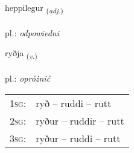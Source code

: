 \documentclass[frontgrid, backgrid]{flacards}\usepackage[]{graphicx}\usepackage[]{xcolor}
\begin{document}
\renewcommand{\flhead}{\vskip5pt \fboxsep=0pt {\small\bfseries\footnotesize Lýsingarorð | przymiotnik}}
\renewcommand{\fcfoot}{\vskip5pt \fboxsep=0pt \hspace{2pt}{\small\bfseries\footnotesize 3K}}

\renewcommand{\blhead}{\vskip5pt {\small\bfseries\footnotesize Lýsingarorð | przymiotnik }}
\renewcommand{\bcfoot}{\vskip5pt \hspace{2pt}{\small\bfseries\footnotesize 3K}}


{heppilegur \small{\textsubscript{(\textit{adj.})}} \\[1ex] %
\textphonetic{[hɛhpɪlɛɣʏr]} \\
pl.: \emph{odpowiedni} \\  [2ex]
\renewcommand*{\arraystretch}{0.8}
}

\renewcommand{\flhead}{\vskip5pt \fboxsep=0pt {\small\bfseries\footnotesize Sagnorð | czasownik}}
\renewcommand{\fcfoot}{\vskip5pt \fboxsep=0pt \hspace{2pt}{\small\bfseries\footnotesize 3K}}

\renewcommand{\blhead}{\vskip5pt {\small\bfseries\footnotesize Sagnorð | czasownik }}
\renewcommand{\bcfoot}{\vskip5pt \hspace{2pt}{\small\bfseries\footnotesize 3K}}


{ryðja \small{\textsubscript{(\textit{v.})}} \\[1ex] %
\textphonetic{[rɪðja]} \\
pl.: \emph{opróżnić} \\  [2ex]
\renewcommand*{\arraystretch}{0.8}
\begin{tabular}{p{1cm}l}
\textsc{1sg}: & ryð -- ruddi -- rutt \\ 
\textsc{2sg}: & ryður -- ruddir -- rutt \\ 
\textsc{3sg}: & ryður -- ruddi -- rutt \\ 
\end{tabular}
}
\end{document}
